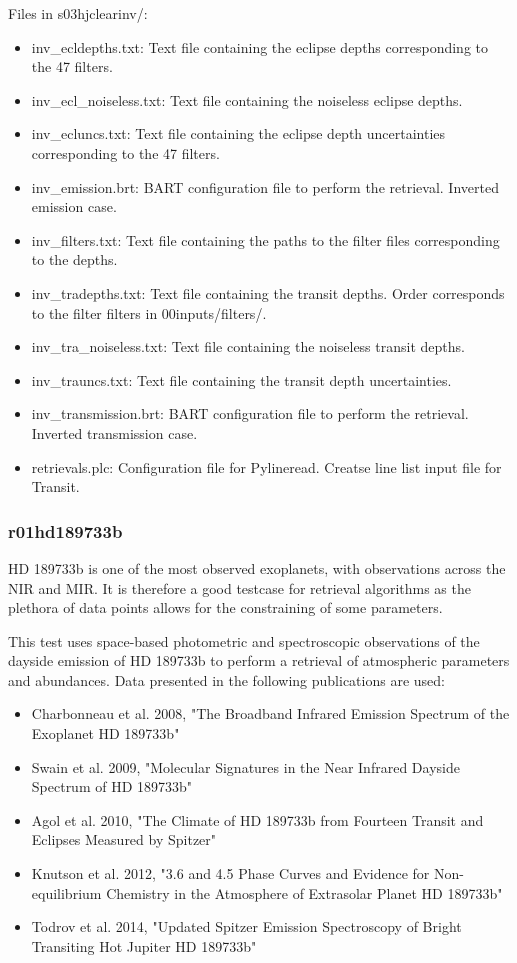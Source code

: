 \documentclass[letterpaper, 12pt]{article}
\begin{document}
Files in s03hjclearinv/:
\begin{itemize} \itemsep0pt
  \item inv{\_}ecldepths.txt: Text file containing the eclipse depths 
        corresponding to the 47 filters.
  \item inv{\_}ecl{\_}noiseless.txt: Text file containing the noiseless eclipse depths.
  \item inv{\_}ecluncs.txt: Text file containing the eclipse depth 
        uncertainties corresponding to the 47 filters.
  \item inv{\_}emission.brt: BART configuration file to perform the retrieval. 
        Inverted emission case.
  \item inv{\_}filters.txt: Text file containing the paths to the filter files corresponding to the depths.
  \item inv{\_}tradepths.txt: Text file containing the transit depths. Order 
        corresponds to the filter filters in 00inputs/filters/.
  \item inv{\_}tra{\_}noiseless.txt: Text file containing the noiseless transit depths.
  \item inv{\_}trauncs.txt: Text file containing the transit depth 
        uncertainties. 
  \item inv{\_}transmission.brt: BART configuration file to perform the 
        retrieval. Inverted transmission case.
  \item retrievals.plc: Configuration file for Pylineread. Creatse line list input file for Transit.
\end{itemize}

\subsubsection{r01hd189733b}
HD 189733b is one of the most observed exoplanets, with observations across the NIR and MIR. 
It is therefore a good testcase for retrieval algorithms as the plethora of 
data points allows for the constraining of some parameters. 

This test uses space-based photometric and spectroscopic observations of the 
dayside emission of HD 189733b to perform a retrieval of atmospheric parameters 
and abundances. Data presented in the following publications are used:
\begin{itemize} \itemsep0pt
  \item Charbonneau et al. 2008, "The Broadband Infrared Emission Spectrum of the Exoplanet HD 189733b"
  \item Swain et al. 2009, "Molecular Signatures in the Near Infrared Dayside Spectrum of HD 189733b"
  \item Agol et al. 2010, "The Climate of HD 189733b from Fourteen Transit and Eclipses Measured by Spitzer"
  \item Knutson et al. 2012, "3.6 and 4.5 \micron Phase Curves and Evidence for Non-equilibrium Chemistry in the Atmosphere of Extrasolar Planet HD 189733b"
  \item Todrov et al. 2014, "Updated Spitzer Emission Spectroscopy of Bright Transiting Hot Jupiter HD 189733b"
\end{itemize}
\end{document}
